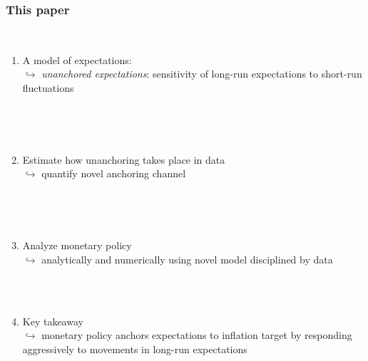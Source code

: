 \documentclass[10pt]{beamer}
\begin{document}
\begin{frame}
	\frametitle{This paper}


\

	
	\begin{enumerate}
%	
%	

	\item A model of expectations:  \\
	$\hookrightarrow$ \emph{unanchored expectations}: sensitivity of long-run expectations to short-run fluctuations 	
	
	\
	
	\
	
	\item Estimate how unanchoring takes place in data \\
	$\hookrightarrow$ quantify novel anchoring channel
	
	\
	
	\
	
	\item Analyze monetary policy \\
	$\hookrightarrow$ analytically and numerically using novel model disciplined by data \\

        \
	
	\
	
	\item Key takeaway \\
	$\hookrightarrow$ monetary policy anchors expectations to inflation target by responding aggressively to movements in long-run expectations \\

	\end{enumerate}
	\end{frame}
\end{document}
